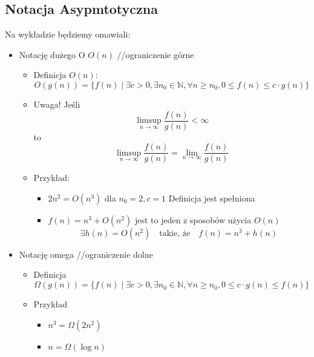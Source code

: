 \documentclass[11pt,a4paper]{article}
\begin{document}
\subsection{Notacja Asypmtotyczna}
Na wykładzie będziemy omawiali:
\begin{itemize}
    \item Notację dużego O $O(n)$ //ograniczenie górne
        \begin{itemize}
                \item Definicja $O(n)$:
                \[
                    O(g(n)) = \{ f(n) \mid \exists c > 0, \exists n_0 \in \mathbb{N}, \forall n \geq n_0, 0 \leq f(n) \leq c \cdot g(n) \}
                \]
            \item Uwaga! \newline
                Jeśli
                \[
                    \limsup_{n \to \infty} \frac{f(n)}{g(n)} < \infty
                \]
                to
                \[
                    \limsup_{n \to \infty} \frac{f(n)}{g(n)} = \lim_{n \to \infty} \frac{f(n)}{g(n)}
                \]
            \item Przykład:
                \begin{itemize}
                    \item $2n^2=O(n^3)$
                        dla $n_0 = 2, c = 1$ Definicja jest spełniona
                    \item $f(n) = n^3 + O(n^2)$ jest to jeden z sposobów użycia $O(n)$
                        \[
                            \exists h(n) = O(n^2) \quad \text{takie, że} \quad f(n) = n^3 + h(n)
                        \]
                \end{itemize}
        \end{itemize}
    \item Notację omega //ograniczenie dolne
        \begin{itemize}
            \item Definicja
                \[
                    \Omega(g(n)) = \{ f(n) \mid \exists c > 0, \exists n_0 \in \mathbb{N}, \forall n \geq n_0, 0 \leq c \cdot g(n) \leq f(n) \}
                \]
            \item Przykład
                \begin{itemize}
                    \item $n^3 = \Omega(2n^2)$
                    \item $n = \Omega(\log n)$
                \end{itemize}
        \end{itemize}

\end{itemize}
\end{document}
